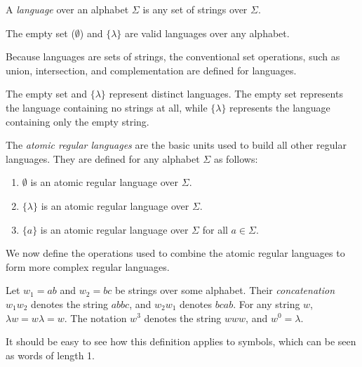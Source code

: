 \documentclass{bcthesis}
\newcommand{\footcite}[2]{\footnote{\cite[pg.~{#2}]{#1}}}
\renewcommand{\footcite}[2]{\cite[pg.~{#2}]{#1}}
\begin{document}
		\begin{definition}[Language]
			A \textit{language} over an alphabet $\Sigma$ is any set of strings over $\Sigma$.\footcite{hopcroft}{2}

			The empty set ($\emptyset$) and $\{ \lambda \}$ are valid languages over any alphabet.\footcite{hopcroft}{2}

			Because languages are sets of strings, the conventional set operations, such as union, intersection, and complementation are defined for languages.\footcite{hopcroft}{5}
		\end{definition}

		\begin{remark}
			The empty set and $\{ \lambda \}$ represent distinct languages. 
			The empty set represents the language containing no strings at all, while $\{ \lambda \}$ represents the language containing only the empty string.\footcite{hopcroft}{2}
		\end{remark}


\label{ch:regular_expressions}
	
	\begin{definition}
		The \textit{atomic regular languages} are the basic units used to build all other regular languages.
		They are defined for any alphabet $\Sigma$ as follows:
		\begin{enumerate}[label=(\roman*), itemsep = -0.3 ex]
			\item $\emptyset$ is an atomic regular language over $\Sigma$.
			\item $\{ \lambda \}$ is an atomic regular language over $\Sigma$.
			\item $\{ a \}$ is an atomic regular language over $\Sigma$ for all $a \in \Sigma$.
		\end{enumerate}
		\footcite{hopcroft}{28}
	\end{definition}

	We now define the operations used to combine the atomic regular languages to form more complex regular languages.

	\begin{definition}[Concatenation]
		Let $w_1 = ab$ and $w_2 = bc$ be strings over some alphabet.
		Their \textit{concatenation} $w_1 w_2$ denotes the string $abbc$, and $w_2 w_1$ denotes $bcab$.
		For any string $w$, $\lambda w = w \lambda = w$.
		The notation $w^3$ denotes the string $www$, and $w^0 = \lambda$.\footcite{salomaa}{1}

		It should be easy to see how this definition applies to symbols, which can be seen as words of length 1.
	\end{definition}
\end{document}
